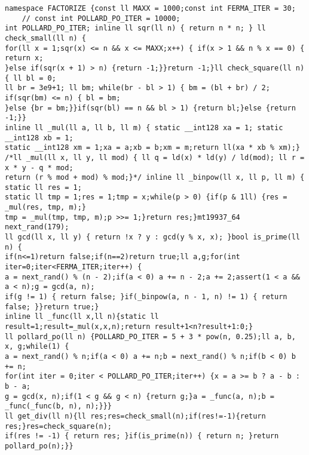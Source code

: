 \documentclass[12pt]{article}
\begin{document}
\begin{verbatim}
namespace FACTORIZE {const ll MAXX = 1000;const int FERMA_ITER = 30;
    // const int POLLARD_PO_ITER = 10000;
int POLLARD_PO_ITER; inline ll sqr(ll n) { return n * n; } ll check_small(ll n) {
for(ll x = 1;sqr(x) <= n && x <= MAXX;x++) { if(x > 1 && n % x == 0) { return x;
}else if(sqr(x + 1) > n) {return -1;}}return -1;}ll check_square(ll n) { ll bl = 0;
ll br = 3e9+1; ll bm; while(br - bl > 1) { bm = (bl + br) / 2; if(sqr(bm) <= n) { bl = bm;
}else {br = bm;}}if(sqr(bl) == n && bl > 1) {return bl;}else {return -1;}}
inline ll _mul(ll a, ll b, ll m) { static __int128 xa = 1; static __int128 xb = 1;
static __int128 xm = 1;xa = a;xb = b;xm = m;return ll(xa * xb % xm);}
/*ll _mul(ll x, ll y, ll mod) { ll q = ld(x) * ld(y) / ld(mod); ll r = x * y - q * mod; 
return (r % mod + mod) % mod;}*/ inline ll _binpow(ll x, ll p, ll m) { static ll res = 1;
static ll tmp = 1;res = 1;tmp = x;while(p > 0) {if(p & 1ll) {res = _mul(res, tmp, m);}
tmp = _mul(tmp, tmp, m);p >>= 1;}return res;}mt19937_64 next_rand(179);
ll gcd(ll x, ll y) { return !x ? y : gcd(y % x, x); }bool is_prime(ll n) {
if(n<=1)return false;if(n==2)return true;ll a,g;for(int iter=0;iter<FERMA_ITER;iter++) {
a = next_rand() % (n - 2);if(a < 0) a += n - 2;a += 2;assert(1 < a && a < n);g = gcd(a, n);
if(g != 1) { return false; }if(_binpow(a, n - 1, n) != 1) { return false; }}return true;}
inline ll _func(ll x,ll n){static ll result=1;result=_mul(x,x,n);return result+1<n?result+1:0;}
ll pollard_po(ll n) {POLLARD_PO_ITER = 5 + 3 * pow(n, 0.25);ll a, b, x, g;while(1) {
a = next_rand() % n;if(a < 0) a += n;b = next_rand() % n;if(b < 0) b += n;
for(int iter = 0;iter < POLLARD_PO_ITER;iter++) {x = a >= b ? a - b : b - a;
g = gcd(x, n);if(1 < g && g < n) {return g;}a = _func(a, n);b = _func(_func(b, n), n);}}}
ll get_div(ll n){ll res;res=check_small(n);if(res!=-1){return res;}res=check_square(n);
if(res != -1) { return res; }if(is_prime(n)) { return n; }return pollard_po(n);}}
\end{verbatim}
\end{document}
